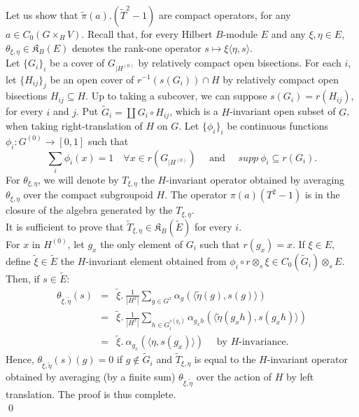 \begin{dem}
Let us show that $\tilde\pi(a). (\tilde T^2-1)$ are compact operators, for any $a\in C_0(G\times_H V)$. Recall that, for every Hilbert $B$-module $E$ and any $\xi,\eta\in E$, $\theta_{\xi,\eta}\in\mathfrak K_B(E)$ denotes the rank-one operator $s\mapsto \xi \langle \eta,s\rangle$.\\ 

Let $\{G_i\}_i$ be a cover of $G_{|H^{(0)}}$ by relatively compact open bisections. For each $i$, let $\{H_{ij}\}_j$ be an open cover of $r^{-1}( s(G_i))\cap H$ by relatively compact open bisections $H_{ij} \subseteq H$. Up to taking a subcover, we can suppose $s(G_i) = r(H_{ij})$, for every $i$ and $j$. Put $\tilde G_i = \coprod G_i \circ H_{ij}$, which is a $H$-invariant open subset of $G$, when taking right-translation of $H$ on $G$. Let $\{\phi_i\}_i$ be continuous functions $\phi_i : G^{(0)}\rightarrow [0,1]$ such that 
\[\sum_{i} \phi_i(x) = 1\quad \forall x\in r(G_{|H^{(0)}}) \quad \text{ and } \quad supp \ \phi_i\subseteq r(G_i) .\] 
For $\theta_{\xi,\eta}$, we will denote by $T_{\xi,\eta}$ the $H$-invariant operator obtained by averaging $\theta_{\xi,\eta}$ over the compact subgroupoid $H$. The operator $\pi(a)(T^2-1)$ is in the closure of the algebra generated by the $T_{\xi, \eta}$.\\%

It is sufficient to prove that $\tilde T_{\xi,\eta} \in \mathfrak K_B(\tilde E)$ for every $i$.\\

For $x$ in $H^{(0)}$, let $g_x$ the only element of $G_i$ such that $r(g_x)= x$. If $\xi \in E$, define $\tilde \xi\in \tilde E$ the $H$-invariant element obtained from $\phi_i \circ r \otimes_s \xi \in C_0(\tilde G_i)\otimes_s E$. Then, if $s\in \tilde E$: 
\[\begin{array}{rcl}
\theta_{\tilde \xi,\tilde \eta}(s) 	& = & \tilde \xi .\ \frac{1}{|H^x|} \sum_{g\in G^x} \alpha_g (\langle \tilde\eta (g), s(g) \rangle) \\
					& = & \tilde \xi .\ \frac{1}{|H^x|} \sum_{h\in G_i^{s(g_x)} } \alpha_{g_x h} (\langle \tilde\eta (g_x h), s(g_x h) \rangle) \\
					& = & \tilde \xi .\  \alpha_{g_x} (\langle \eta, s(g_x) \rangle)  \quad \text{ by $H$-invariance.	}
\end{array}\]
Hence, $\theta_{\tilde \xi,\tilde \eta}(s)(g) = 0$ if $g\notin \tilde G_i$ and $\tilde T_{\xi,\eta} $ is equal to the $H$-invariant operator obtained by averaging (by a finite sum) $ \theta_{\tilde\xi,\tilde\eta}$ over the action of $H$ by left translation. The proof is thus complete.\\
\qed 
\end{dem}


